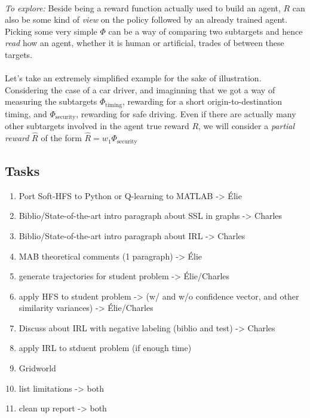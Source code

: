 \documentclass{article}
\begin{document}
\paragraph{}
\emph{To explore:} Beside being a reward function actually used to build an agent, $R$ can also be some kind of \emph{view} on the policy followed by an already trained agent. Picking some very simple $\Phi$ can be a way of comparing two subtargets and hence \emph{read} how an agent, whether it is human or artificial, trades of between these targets.

\paragraph{}
Let's take an extremely simplified example for the sake of illustration. Considering the case of a car driver, and imaginning that we got a way of measuring the subtargets $\Phi_{\text{timing}}$, rewarding for a short origin-to-destination timing, and $\Phi_{\text{security}}$, rewarding for safe driving. Even if there are actually many other subtargets involved in the agent true reward $R$, we will consider a \emph{partial reward} $\hat R$ of the form $\hat R = w_1 \Phi_{\text{security}}$








\begin{appendices}
\section{Tasks}

\begin{enumerate}
    \item Port Soft-HFS to Python or Q-learning to MATLAB -> Élie
    \item Biblio/State-of-the-art intro paragraph about SSL in graphs -> Charles
    \item Biblio/State-of-the-art intro paragraph about IRL -> Charles
    \item MAB theoretical comments (1 paragraph) -> Élie
    \item generate trajectories for student problem -> Élie/Charles
    \item apply HFS to student problem -> (w/ and w/o confidence vector, and other similarity variances) -> Élie/Charles
    \item Discuss about IRL with negative labeling (biblio and test) -> Charles
    \item apply IRL to stduent problem (if enough time)
    \item Gridworld
    \item list limitations -> both
    \item clean up report -> both
\end{enumerate}


\end{appendices}
\end{document}
